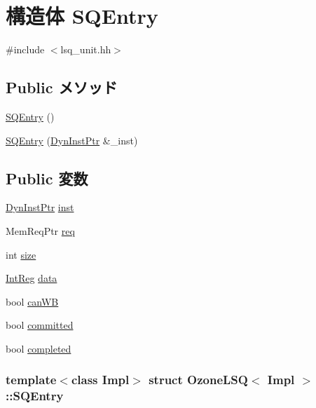 \hypertarget{structOzoneLSQ_1_1SQEntry}{
\section{構造体 SQEntry}
\label{structOzoneLSQ_1_1SQEntry}
}


{\ttfamily \#include $<$lsq\_\-unit.hh$>$}\subsection*{Public メソッド}
\begin{DoxyCompactItemize}
\item 
\hyperlink{structOzoneLSQ_1_1SQEntry_a3e45ad78b5babe810aa50349be32637b}{SQEntry} ()
\item 
\hyperlink{structOzoneLSQ_1_1SQEntry_a3b163ba1f4e957334b0fe8a659562015}{SQEntry} (\hyperlink{classOzoneLSQ_a028ce10889c5f6450239d9e9a7347976}{DynInstPtr} \&\_\-inst)
\end{DoxyCompactItemize}
\subsection*{Public 変数}
\begin{DoxyCompactItemize}
\item 
\hyperlink{classOzoneLSQ_a028ce10889c5f6450239d9e9a7347976}{DynInstPtr} \hyperlink{structOzoneLSQ_1_1SQEntry_af5d4fb974eeb4507d4c837d365d0cefc}{inst}
\item 
MemReqPtr \hyperlink{structOzoneLSQ_1_1SQEntry_a129d82cb393847d581480530d3be9486}{req}
\item 
int \hyperlink{structOzoneLSQ_1_1SQEntry_a439227feff9d7f55384e8780cfc2eb82}{size}
\item 
\hyperlink{classOzoneLSQ_a1355cb78d031430d4d70eb5080267604}{IntReg} \hyperlink{structOzoneLSQ_1_1SQEntry_a075dba7fb6badd5634e3d6f7da55c239}{data}
\item 
bool \hyperlink{structOzoneLSQ_1_1SQEntry_a2e445065a38a8a82256decf088cd3e6d}{canWB}
\item 
bool \hyperlink{structOzoneLSQ_1_1SQEntry_a28712f511a3687635fff96e084fdab9a}{committed}
\item 
bool \hyperlink{structOzoneLSQ_1_1SQEntry_a8c06e370b709d689e392a4b7b53b47c5}{completed}
\end{DoxyCompactItemize}
\subsubsection*{template$<$class Impl$>$ struct OzoneLSQ$<$ Impl $>$::SQEntry}




